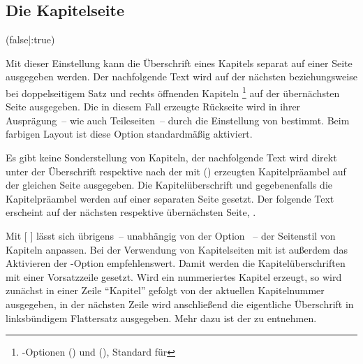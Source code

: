 \begin{DeclareEntity*}{}
\begin{DeclareEntity*}{}
\begin{DeclareEntity*}{}
\subsection{%
  Die Kapitelseite%
  \label{sec:chapter}%
}

\begin{Declaration}
  {}
  (false|:true)

Mit dieser Einstellung kann die Überschrift eines Kapitels separat auf einer 
Seite ausgegeben werden. Der nachfolgende Text wird auf der nächsten 
beziehungsweise bei doppelseitigem Satz und rechts öffnenden Kapiteln%
\footnote{%
  \KOMAScript-Optionen () und 
  (), Standard für %
}
auf der übernächsten Seite ausgegeben. Die in diesem Fall erzeugte Rückseite 
wird in ihrer Ausprägung~-- wie auch Teileseiten~-- durch die Einstellung von 
 bestimmt. Beim farbigen Layout ist diese Option 
standardmäßig aktiviert. \notudscrartcl
\begin{DeclareValues}[Vakatseiten]
  Es gibt keine Sonderstellung von Kapiteln, der nachfolgende Text wird direkt 
  unter der Überschrift respektive nach der mit 
  () erzeugten Kapitelpräambel 
  auf der gleichen Seite ausgegeben.
  Die Kapitelüberschrift und gegebenenfalls die Kapitelpräambel werden auf 
  einer separaten Seite gesetzt. Der folgende Text erscheint auf der nächsten 
  respektive übernächsten Seite, .
\end{DeclareValues}

Mit [%
]
lässt sich übrigens~-- unabhängig von der Option ~-- der 
Seitenstil von Kapiteln anpassen. Bei der Verwendung von Kapitelseiten mit 
 ist außerdem das Aktivieren der \KOMAScript-Option 
empfehlenswert. Damit werden die Kapitelüberschriften mit einer Vorsatzzeile 
gesetzt. Wird ein nummeriertes Kapitel erzeugt, so wird zunächst in einer Zeile 
\enquote{Kapitel} gefolgt von der aktuellen Kapitelnummer ausgegeben, in der 
nächsten Zeile wird anschließend die eigentliche Überschrift in linksbündigem 
Flattersatz ausgegeben. Mehr dazu ist der  
zu entnehmen.
\end{Declaration}


\end{DeclareEntity*}
\end{DeclareEntity*}
\end{DeclareEntity*}
